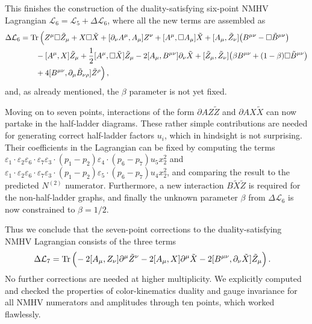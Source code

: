 \documentclass[11pt,a4paper]{article}
\newcommand{\ee}[2]{\varepsilon_{#1} {\cdot} \varepsilon_{#2}}
\newcommand{\z}{x}
\newcommand{\scalarF}{\textcolor{black}{X}}
\begin{document}
This finishes the construction of the duality-satisfying six-point NMHV Lagrangian  $\mathcal{L}_6=\mathcal{L}_5+  \Delta  \mathcal{L}_6$, where all the new terms are assembled as
 \begin{align}
\Delta  \mathcal{L}_6 &= \text{Tr} \, \Big( Z^\mu \Box \tilde{Z}_\mu + X \Box \tilde{X}+ 
  [\partial_\nu A^\mu ,A_\mu]  Z^\nu +  [A^\mu, \Box  A_\mu ]\tilde{X}
+ [A_\mu, \tilde{Z}_\nu ]\big( B^{\mu \nu} 
-   \Box \tilde{B}^{\mu \nu} \big) \notag \\
%
& \quad \quad - [A^\mu, X ]\tilde{Z}_\mu + \frac{1}{2} [A^\mu, \Box \tilde{X}] \tilde{Z}_\mu - 2 [A_\mu, B^{\mu \nu} ] \partial_\nu \tilde{X} +  [\tilde{Z}_{\mu} ,\tilde{Z}_{\nu}] \big( \beta  B^{\mu \nu}
+ (1-\beta)  \Box \tilde{B}^{\mu \nu} \big) \notag \\
%
& \quad \quad  + 4  [B^{\mu \nu} ,\partial_\mu\tilde{B}_{\nu\rho} ] \tilde{Z}^{\rho} \Big) \, ,
\end{align}
and, as already mentioned, the $\beta$ parameter is not yet fixed.

Moving on to seven points, interactions of the form $\partial A Z \tilde{Z}$ and $\partial A X \tilde{X}$ can now partake in the half-ladder diagrams. These rather simple contributions are needed for generating correct  half-ladder factors $u_i$, which in hindsight is not surprising. 
Their coefficients in the Lagrangian can be fixed by computing the terms $\ee{1}{2} \ee{6}{7} \varepsilon_3 {\cdot} (p_1-p_2) \varepsilon_4 {\cdot} (p_6-p_7) u_5  \z_2^2$ and $\ee{1}{2} \ee{6}{7} \varepsilon_3 {\cdot} (p_1-p_2) \varepsilon_5 {\cdot} (p_6-p_7) u_4  \z_2^2$, and comparing the result to the predicted $N^{(2)}$ numerator. Furthermore, a new interaction $B \tilde{X} \tilde{Z}$ is required for the non-half-ladder graphs, and finally the unknown parameter $\beta$ from $\Delta  \mathcal{L}_6$ is now constrained to $\beta = 1/2$.    

Thus we conclude that the seven-point corrections to the duality-satisfying NMHV Lagrangian consists of the three terms
\begin{align}
\Delta \mathcal{L}_7 &= \text{Tr} \, \Big( \! -2  [A_\mu , Z_\nu] \partial^\mu \tilde{Z}^\nu -2  [A_\mu , \scalarF ] \partial^\mu \tilde{\scalarF}  - 2 [B^{\mu \nu}, \partial_\nu \tilde{X}] \tilde{Z}_\mu \Big) \, .
\end{align}
 No further corrections are needed at higher multiplicity.  We explicitly computed and checked the properties of color-kinematics duality and gauge invariance for all NMHV numerators and amplitudes through ten points, which worked flawlessly.   
 
\end{document}
